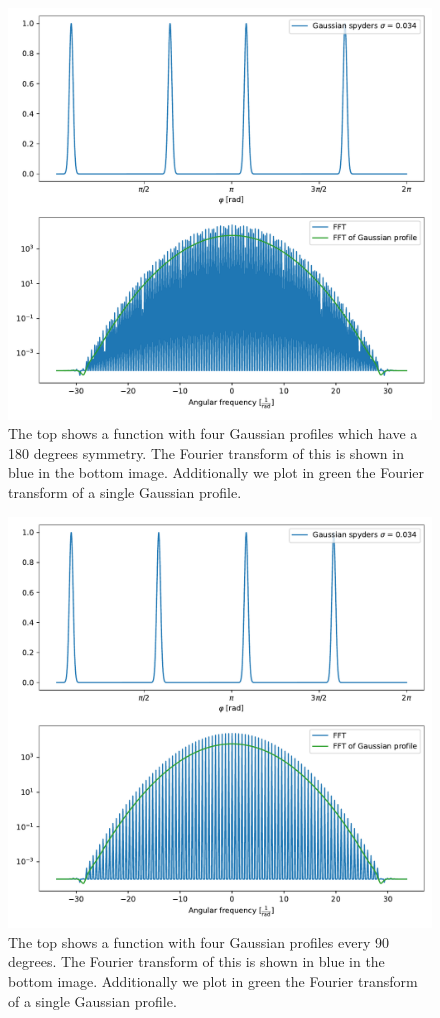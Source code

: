 \begin{figure}[H]
	\centering
		\includegraphics[width=1.0\textwidth]{pics/Gaussian_fourspyders.pdf}
		\caption{The top shows a function with four Gaussian profiles which have a 180 degrees symmetry. The Fourier transform of this is shown in blue in the bottom image. Additionally we plot in green the Fourier transform of a single Gaussian profile.}
		\label{fig:Gauss_fourspyders}
\end{figure} 
\begin{figure}[H]
	\centering
		\includegraphics[width=1.0\textwidth]{pics/Gaussian_fourspyders90.pdf}
		\caption{The top shows a function with four Gaussian profiles every 90 degrees. The Fourier transform of this is shown in blue in the bottom image. Additionally we plot in green the Fourier transform of a single Gaussian profile.}
		\label{fig:Gauss_fourspyders90}
\end{figure} 


